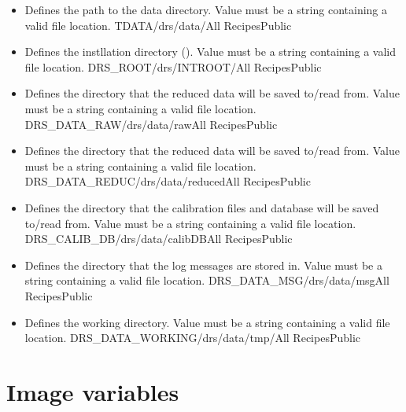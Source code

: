 \begin{itemize}

\item {}
{Defines the path to the data directory. Value must be a string containing a valid file location.}
{TDATA}{/drs/data/}{All Recipes}{\configtxtfile}{\spirouCONST}{Public}

\item {}
{Defines the instllation directory (\InstallDIR). Value must be a string containing a valid file location.}
{DRS\_ROOT}{/drs/INTROOT/}{All Recipes}{\configtxtfile}{\spirouCONST}{Public}

\item {}
{Defines the directory that the reduced data will be saved to/read from. Value must be a string containing a valid file location.}
{DRS\_DATA\_RAW}{/drs/data/raw}{All Recipes}{\configtxtfile}{\spirouCONST}{Public}

\item {}
{Defines the directory that the reduced data will be saved to/read from. Value must be a string containing a valid file location.}
{DRS\_DATA\_REDUC}{/drs/data/reduced}{All Recipes}{\configtxtfile}{\spirouCONST}{Public}

\item {}
{Defines the directory that the calibration files and database will be saved to/read from. Value must be a string containing a valid file location.}
{DRS\_CALIB\_DB}{/drs/data/calibDB}{All Recipes}{\configtxtfile}{\spirouCONST}{Public}

\item {}
{Defines the directory that the log messages are stored in. Value must be a string containing a valid file location.}
{DRS\_DATA\_MSG}{/drs/data/msg}{All Recipes}{\configtxtfile}{\spirouCONST}{Public}

\item {}
{Defines the working directory. Value must be a string containing a valid file location.}
{DRS\_DATA\_WORKING}{/drs/data/tmp/}{All Recipes}{\configtxtfile}{\spirouCONST}{Public}

\end{itemize}


\section{Image variables}
\label{ch:variables:image}

